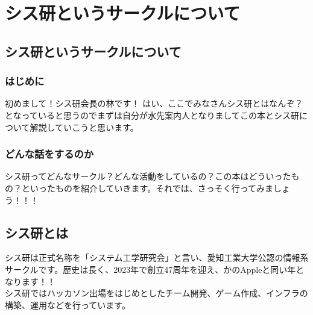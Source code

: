 \chapter{シス研というサークルについて}

\section{シス研というサークルについて}
\subsection{はじめに}
初めまして！シス研会長の林です！
はい、ここでみなさんシス研とはなんぞ？となっていると思うのでまずは自分が水先案内人となりましてこの本とシス研について解説していこうと思います。

\subsection{どんな話をするのか}
シス研ってどんなサークル？どんな活動をしているの？この本はどういったもの？といったものを紹介していきます。それでは、さっそく行ってみましょう！！！

\section{シス研とは}
シス研は正式名称を「システム工学研究会」と言い、愛知工業大学公認の情報系サークルです。歴史は長く、2023年で創立47周年を迎え、かのAppleと同い年となります！！ \\
シス研ではハッカソン出場をはじめとしたチーム開発、ゲーム作成、インフラの構築、運用などを行っています。

